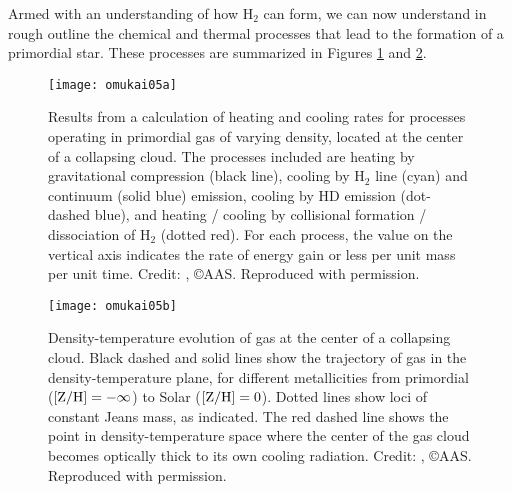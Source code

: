 Armed with an understanding of how H$_2$ can form, we can now understand in rough outline the chemical and thermal processes that lead to the formation of a primordial star. These processes are summarized in Figures \ref{fig:omukai05a} and \ref{fig:omukai05b}.

\begin{figure}
\texttt{[image: omukai05a]}
\caption[Heating and cooling processes in primordial gas]{
\label{fig:omukai05a}
Results from a calculation of heating and cooling rates for processes operating in primordial gas of varying density, located at the center of a collapsing cloud. The processes included are heating by gravitational compression (black line), cooling by H$_2$ line (cyan) and continuum (solid blue) emission, cooling by HD emission (dot-dashed blue), and heating / cooling by collisional formation / dissociation of H$_2$ (dotted red). For each process, the value on the vertical axis indicates the rate of energy gain or less per unit mass per unit time. Credit: \citet{omukai05a}, \copyright AAS. Reproduced with permission.
}
\end{figure}

\begin{figure}
\texttt{[image: omukai05b]}
\caption[Density-temperature evolution in primordial gas]{
\label{fig:omukai05b}
Density-temperature evolution of gas at the center of a collapsing cloud. Black dashed and solid lines show the trajectory of gas in the density-temperature plane, for different metallicities from primordial ($[{\rm Z}/{\rm H}] = -\infty$) to Solar ($[{\rm Z}/{\rm H}] = 0$). Dotted lines show loci of constant Jeans mass, as indicated. The red dashed line shows the point in density-temperature space where the center of the gas cloud becomes optically thick to its own cooling radiation. Credit: \citet{omukai05a}, \copyright AAS. Reproduced with permission.
}
\end{figure}

